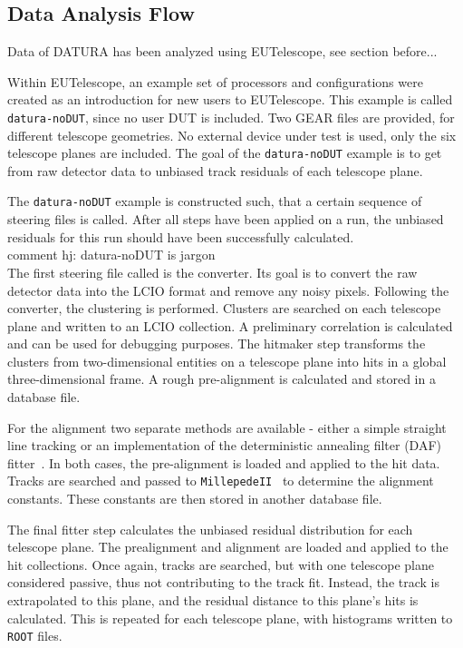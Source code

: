 \subsection{Data Analysis Flow}

Data of DATURA has been analyzed using EUTelescope, see section before...

\label{sec:datura-nodut}
Within EUTelescope, an example set of processors and configurations were created as an introduction for new users to EUTelescope.
This example is called \texttt{datura-noDUT}, since no user DUT is included.
Two GEAR files are provided, for different telescope geometries.
No external device under test is used, only the six \Mimosa telescope planes are included.
The goal of the \texttt{datura-noDUT} example is to get from raw detector data to unbiased track residuals of each telescope plane.

The \texttt{datura-noDUT} example is constructed such, that a certain sequence of steering files is called.
After all steps have been applied on a run, the unbiased residuals for this run should have been successfully calculated.
\\{comment hj: datura-noDUT is jargon}\\

The first steering file called is the converter.
Its goal is to convert the raw \Mimosa detector data into the LCIO format and remove any noisy pixels.
Following the converter, the clustering is performed.
Clusters are searched on each telescope plane and written to an LCIO collection.
A preliminary correlation is calculated and can be used for debugging purposes.
The hitmaker step transforms the clusters from two-dimensional entities on a telescope plane into hits in a global three-dimensional frame.
A rough pre-alignment is calculated and stored in a database file.

For the alignment two separate methods are available - either a simple straight line tracking or an implementation of the deterministic annealing filter (DAF) fitter~\cite{ref:daffitter}.
In both cases, the pre-alignment is loaded and applied to the hit data.
Tracks are searched and passed to \texttt{MillepedeII}~\cite{Blobel-2006} to determine the alignment constants.
These constants are then stored in another database file.

The final fitter step calculates the unbiased residual distribution for each telescope plane.
The prealignment and alignment are loaded and applied to the hit collections.
Once again, tracks are searched, but with one telescope plane considered passive, thus not contributing to the track fit.
Instead, the track is extrapolated to this plane, and the residual distance to this plane's hits is calculated.
This is repeated for each telescope plane, with histograms written to \texttt{ROOT} files.

